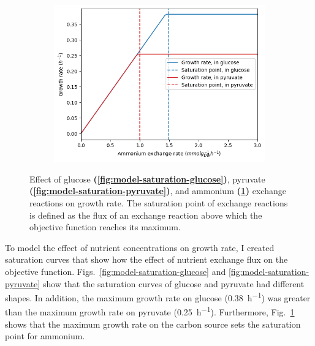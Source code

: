 \begin{figure}
  \begin{subfigure}[t]{0.45\textwidth}
  \centering
    \includegraphics[width=\linewidth]{saturation_amm}
    \caption{
    }
    \label{fig:model-saturation-ammonium}
  \end{subfigure}

  \caption[
    Effect of exchange reactions on growth rate
  ]{
    Effect of glucose \textbf{(\ref{fig:model-saturation-glucose})}, pyruvate \textbf{(\ref{fig:model-saturation-pyruvate})}, and ammonium \textbf{(\ref{fig:model-saturation-ammonium})} exchange reactions on growth rate.
    The saturation point of exchange reactions is defined as the flux of an exchange reaction above which the objective function reaches its maximum.
  }
  \label{fig:model-saturation}
\end{figure}

To model the effect of nutrient concentrations on growth rate, I created saturation curves that show how the effect of nutrient exchange flux on the objective function.
Figs.\ \ref{fig:model-saturation-glucose} and \ref{fig:model-saturation-pyruvate} show that the saturation curves of glucose and pyruvate had different shapes.
In addition, the maximum growth rate on glucose (\SI{0.38}{\hour^{-1}}) was greater than the maximum growth rate on pyruvate (\SI{0.25}{\hour^{-1}}).
Furthermore, Fig.\ \ref{fig:model-saturation-ammonium} shows that the maximum growth rate on the carbon source sets the saturation point for ammonium.

